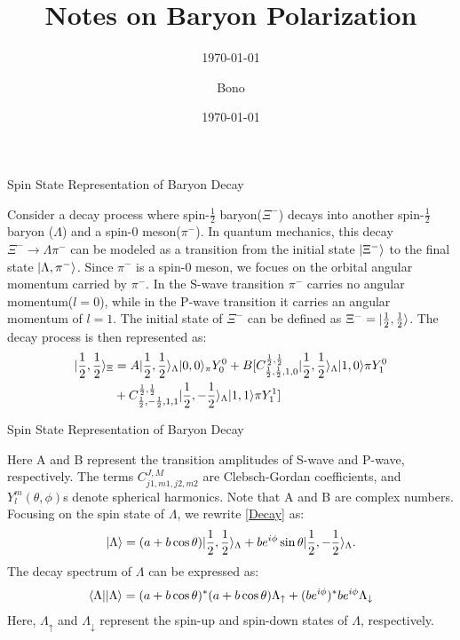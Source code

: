 \documentclass[
	xcolor=dvipsnames,
	10pt, 
	]{beamer}
\title[]{Notes on Baryon Polarization}
\author[\frac{1}{2}uthor]{Bono}
\institute{Bono University}
\date{\today}
\subtitle{\today}
\begin{document}
\begin{frame}[t,plain] %
       \titlepage
\end{frame}
\begin{frame}{Spin State Representation of Baryon Decay}
	\begin{block}{}
		Consider a decay process where spin-$\frac{1}{2}$ baryon($\Xi^-$)  decays into another spin-$\frac{1}{2}$ baryon ($\Lambda$) and a spin-0 meson($\pi^-$). In quantum mechanics, this decay $\Xi^-\to \Lambda\pi^-$  can be modeled as a transition from the initial state $|\Xi^-\rangle$ to the final state $|\Lambda,\pi^-\rangle$. Since $\pi^-$ is a spin-0 meson, we focues on the orbital angular momentum carried by $\pi^-$. In the S-wave transition  $\pi^-$ carries no angular momentum($l=0$), while in the P-wave transition it carries an angular momentum of $l=1$.  The initial state of $\Xi^-$ can be defined as		$\Xi^-=|\frac{1}{2},\frac{1}{2}\rangle$. The decay process is then represented as:
		\begin{align}
			|\frac{1}{2},\frac{1}{2}\rangle_\Xi &= A |\frac{1}{2},\frac{1}{2}\rangle_\Lambda|0,0\rangle_\pi Y_0^0 +B[C_{\frac{1}{2},\frac{1}{2},1,0}^{\frac{1}{2},\frac{1}{2}}|\frac{1}{2},\frac{1}{2}\rangle_\Lambda|1,0\rangle\pi Y_1^0\nonumber\\
			&+C_{\frac{1}{2},-\frac{1}{2},1,1}^{\frac{1}{2},\frac{1}{2}}|\frac{1}{2},-\frac{1}{2}\rangle_\Lambda|1,1\rangle\pi Y_1^1]\label{Decay}
		\end{align}
	\end{block}
\end{frame}
\begin{frame}{Spin State Representation of Baryon Decay}
	\begin{block}{}
	Here A and B represent the transition amplitudes of S-wave and P-wave, respectively. The terms $C_{j1,m1,j2,m2}^{J,M}$  are Clebsch-Gordan coefficients, and $Y_l^m(\theta,\phi)$s denote spherical harmonics. Note that A and B are complex numbers. Focusing on the spin state of $\Lambda$, we rewrite \eqref{Decay} as:
	\begin{align}
		|\Lambda\rangle = (a + b\cos\theta)|\frac{1}{2},\frac{1}{2}\rangle_\Lambda + be^{i\phi}\sin\theta |\frac{1}{2},-\frac{1}{2}\rangle_\Lambda.\label{State}
	\end{align}
	The decay spectrum of $\Lambda$ can be expressed as:
	\begin{align}
		\langle \Lambda||\Lambda\rangle = (a+b\cos\theta)^* (a+b\cos\theta)\Lambda_{\uparrow}+ (be^{i\phi})^*be^{i\phi}\Lambda_{\downarrow}\label{Lambda}
	\end{align}
	Here, $\Lambda_{\uparrow}$ and $\Lambda_{\downarrow}$ represent the spin-up and spin-down states of $\Lambda$, respectively.
\end{block}
\end{frame}
\end{document}
